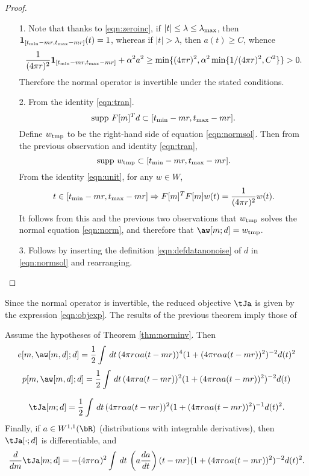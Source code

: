 \begin{proof}
  \begin{itemize}
  \item[1. ]Note that thanks to \ref{eqn:zeroinc}, if $|t|\le
    \lambda \le \lambda_{\rm max}$, then ${\bf 1}_{[t_{\rm min}-mr,  
      t_{\rm max}-mr]}(t) = 1$, whereas if $|t|>\lambda$,
    then $a(t) \ge C$, whence
    \[
      \frac{1}{(4\pi r)^2}  {\bf 1}_{[t_{\rm min}-mr,  
        t_{\rm max}-mr]} + \alpha^2a^2  \ge \min\{(4\pi r)^2,
      \alpha^2\min\{1/(4\pi r)^2,C^2\} \}> 0.
    \]
    Therefore the normal operator is invertible under the stated
    conditions.

  \item[2. ]From the identity \ref{eqn:tran}.
    \[
      \mbox{supp }F[m]^Td \subset [t_{\rm min}-mr,t_{\rm max}-mr].
    \]
    Define $w_{\rm tmp}$ to be the right-hand side of equation \ref{eqn:normsol}. Then
    from the previous observation and identity \ref{eqn:tran},
    \[
      \mbox{supp }w_{\rm tmp} \subset [t_{\rm min}-mr,t_{\rm max}-mr].
    \]
    From the identity \ref{eqn:unit}, for any $w \in W$,
    \[
      t \in [t_{\rm min}-mr,t_{\rm max}-mr] \Rightarrow F[m]^TF[m]w(t)
      = \frac{1}{(4 \pi r)^2}w(t).
    \]
    It follows from this and the previous two observations that
    $w_{\rm tmp}$ solves the normal equation \ref{eqn:norm}, and
    therefore that $\aw[m;d]=w_{\rm tmp}$.

  \item[3. ]Follows by inserting the definition
    \ref{eqn:defdatanonoise} of $d$ in \ref{eqn:normsol} and
    rearranging.
  \end{itemize}
\end{proof}

Since the normal operator is invertible, the reduced
objective $\tJa$ is given by the expression \ref{eqn:objexp}.
The results of the previous theorem imply those of

\begin{theorem}
  \label{thm:epjgen}
  Assume the hypotheses of Theorem \ref{thm:norminv}. Then
  \begin{equation}
  \label{eqn:residnormgen}
  e[m,\aw[m,d];d] = \frac{1}{2}\int \,dt\,(4\pi r \alpha a(t-mr))^4(1 +
  (4\pi r \alpha a(t-mr))^2)^{-2}d(t)^2
\end{equation}
\begin{equation}
  \label{eqn:anninormgen}
  p[m,\aw[m,d];d] = \frac{1}{2}\int \,dt\,(4\pi r a(t-mr))^2(1 +
  (4\pi r \alpha a(t-mr))^2)^{-2}d(t)
\end{equation}

\begin{equation}
  \label{eqn:expjgen}
\tJa[m;d] = \frac{1}{2}\int\,dt\,(4\pi r \alpha a(t-mr))^2(1+(4\pi r \alpha 
a(t-mr))^2)^{-1}d(t)^2. 
\end{equation}
Finally, if $a \in W^{1,1}(\bR)$ (distributions with integrable 
derivatives), then $\tJa[\cdot;d]$ is differentiable, and 
\begin{equation}
  \label{eqn:dexpjgen}
  \frac{d}{dm}\tJa[m;d] = -(4 \pi r \alpha)^2 \int \,dt \, 
  \left(a\frac{da}{dt}\right)(t-mr)(1+(4\pi r \alpha 
  a(t-mr))^2)^{-2}d(t)^2. 
\end{equation}
\end{theorem}

